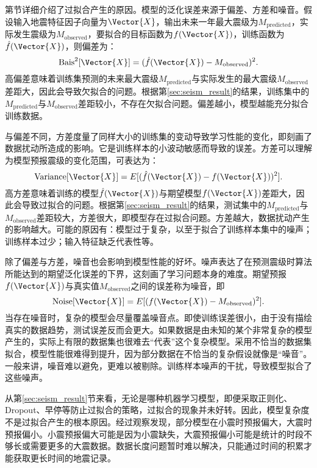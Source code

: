 第\label{sec:ml_fitting}节详细介绍了过拟合产生的原因。模型的泛化误差来源于偏差、方差和噪音。假设输入地震特征因子向量为$\Vector{X}$，输出未来一年最大震级为$M_{\text{predicted}}$，实际发生震级为$M_{\text{observed}}$，要拟合的目标函数为$f(\Vector{X})$，训练函数为$\hat{f}(\Vector{X})$，则偏差为：
\begin{equation}
  \label{eq:seism_bias}
  \mathrm{Bais}^2[\Vector{X}]=(\hat{f}(\Vector{X})-M_{\text{observed}})^2.
\end{equation}
高偏差意味着训练集预测的未来最大震级$M_{\text{predicted}}$与实际发生的最大震级$M_{\text{observed}}$差距大，因此会导致欠拟合的问题。根据第\ref{sec:seism_result}的结果，训练集中的$M_{\text{predicted}}$与$M_{\text{observed}}$差距较小，不存在欠拟合问题。偏差越小，模型越能充分拟合训练数据。

与偏差不同，方差度量了同样大小的训练集的变动导致学习性能的变化，即刻画了数据扰动所造成的影响。它是训练样本的小波动敏感而导致的误差。方差可以理解为模型预报震级的变化范围，可表达为：
\begin{equation}
  \label{eq:seism_variance}
  \mathrm{Variance}[\Vector{X}]=E[(\hat{f}(\Vector{X})-f(\Vector{X}))^2].
\end{equation}
高方差意味着训练的模型$\hat{f}(\Vector{X})$与期望模型$f(\Vector{X})$差距大，因此会导致过拟合的问题。根据第\ref{sec:seism_result}的结果，测试集中的$M_{\text{predicted}}$与$M_{\text{observed}}$差距较大，方差很大，即模型存在过拟合问题。方差越大，数据扰动产生的影响越大。可能的原因有：模型过于复杂，以至于拟合了训练样本集中的噪声；训练样本过少；输入特征缺乏代表性等。

除了偏差与方差，噪音也会影响到模型性能的好坏。噪声表达了在预测震级时算法所能达到的期望泛化误差的下界，这刻画了学习问题本身的难度。期望预报$f(\Vector{X})$与真实值$M_{\text{observed}}$之间的误差称为噪音，即
\begin{equation}
  \label{eq:ml_noise}
  \mathrm{Noise}[\Vector{X}]=E[(f(\Vector{X})-M_{\text{observed}})^2].
\end{equation}
当存在噪音时，复杂的模型会尽量覆盖噪音点。即使训练误差很小，由于没有描绘真实的数据趋势，测试误差反而会更大。如果数据是由未知的某个非常复杂的模型产生的，实际上有限的数据集也很难去“代表”这个复杂模型。采用不恰当的数据集拟合，模型性能很难得到提升，因为部分数据在不恰当的复杂假设就像是“噪音”。一般来讲，噪音难以避免，更难以被剔除。训练样本噪声的干扰，导致模型拟合了这些噪声。

从第\ref{sec:seism_result}节来看，无论是哪种机器学习模型，即便采取正则化、Dropout、早停等防止过拟合的策略，过拟合的现象并未好转。因此，模型复杂度不是过拟合产生的根本原因。经过观察发现，部分模型在小震时预报偏大，大震时预报偏小。小震预报偏大可能是因为小震缺失，大震预报偏小可能是统计的时段不够长或需要更多的大震数据。数据长度问题暂时难以解决，只能通过时间的积累才能获取更长时间的地震记录。

